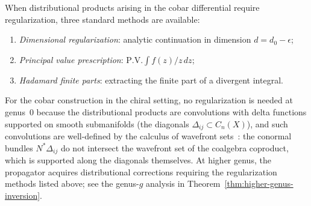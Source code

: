 \begin{remark}\label{rem:regularization-methods}
When distributional products arising in the cobar differential require regularization, three standard methods are available:
\begin{enumerate}
\item \emph{Dimensional regularization}: analytic continuation in dimension $d = d_0 - \epsilon$;
\item \emph{Principal value prescription}: $\mathrm{P.V.}\int f(z)/z\,dz$;
\item \emph{Hadamard finite parts}: extracting the finite part of a divergent integral.
\end{enumerate}
For the cobar construction in the chiral setting, no regularization is needed at genus~$0$ because the distributional products are convolutions with delta functions supported on smooth submanifolds (the diagonals $\Delta_{ij} \subset C_n(X)$), and such convolutions are well-defined by the calculus of wavefront sets~\cite{Hormander}: the conormal bundles $N^*\Delta_{ij}$ do not intersect the wavefront set of the coalgebra coproduct, which is supported along the diagonals themselves.
At higher genus, the propagator acquires distributional corrections requiring the regularization methods listed above; see the genus-$g$ analysis in Theorem~\ref{thm:higher-genus-inversion}.
\end{remark}

